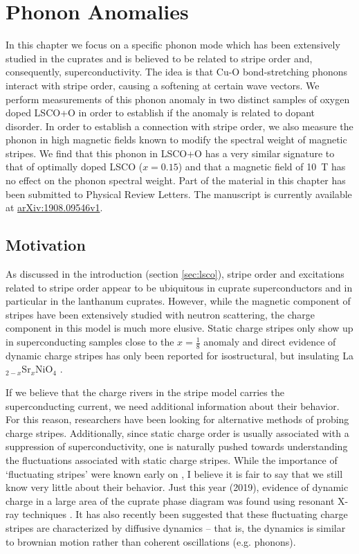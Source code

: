 \chapter{Phonon Anomalies}\label{ch:anomaly}

In this chapter we focus on a specific phonon mode which has been extensively studied in the cuprates and is believed to be related to stripe order and, consequently, superconductivity. The idea is that Cu-O bond-stretching phonons interact with stripe order, causing a softening at certain wave vectors. We perform measurements of this phonon anomaly in two distinct samples of oxygen doped LSCO+O in order to establish if the anomaly is related to dopant disorder. In order to establish a connection with stripe order, we also measure the phonon in high magnetic fields known to modify the spectral weight of magnetic stripes. We find that this phonon in LSCO+O has a very similar signature to that of optimally doped LSCO ($x=0.15$) and that a magnetic field of \SI{10}{\tesla} has no effect on the phonon spectral weight. Part of the material in this chapter has been submitted to Physical Review Letters. The manuscript is currently available at \href{https://arxiv.org/abs/1908.09546v1}{arXiv:1908.09546v1}.

\section{Motivation}
As discussed in the introduction (section \ref{sec:lsco}), stripe order and excitations related to stripe order appear to be ubiquitous in cuprate superconductors and in particular in the lanthanum cuprates. However, while the magnetic component of stripes have been extensively studied with neutron scattering, the charge component in this model is much more elusive. Static charge stripes only show up in superconducting samples close to the $x=\frac{1}{8}$ anomaly \cite{Tranquada1995, Tranquada1996, Christensen2014, Thampy2014, Croft2014} and direct evidence of dynamic charge stripes has only been reported for isostructural, but insulating La$_{2-x}$Sr$_x$NiO$_4$ \cite{Anissimova2014}.

If we believe that the charge rivers in the stripe model carries the superconducting current, we need additional information about their behavior. For this reason, researchers have been looking for alternative methods of probing charge stripes. Additionally, since static charge order is usually associated with a suppression of superconductivity, one is naturally pushed towards understanding the fluctuations associated with static charge stripes. While the importance of `fluctuating stripes' were known early on \cite{Kivelson2003}, I believe it is fair to say that we still know very little about their behavior. Just this year (2019), evidence of dynamic charge in a large area of the cuprate phase diagram was found using resonant X-ray techniques \cite{Arpaia2019}. It has also recently been suggested that these fluctuating charge stripes are characterized by diffusive dynamics \cite{Mitrano2019} -- that is, the dynamics is similar to brownian motion rather than coherent oscillations (e.g. phonons).

